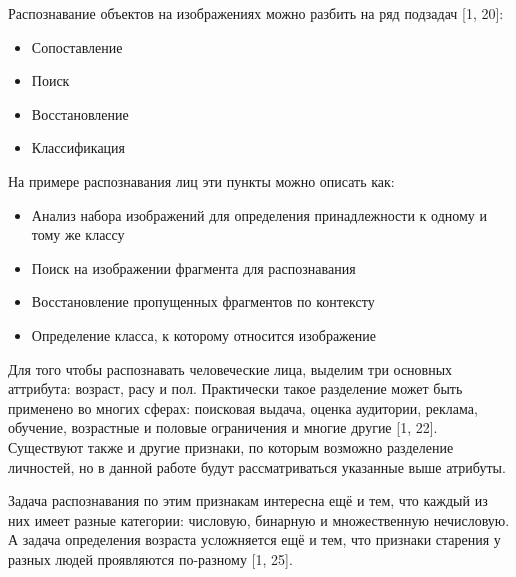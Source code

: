 \documentclass[main.tex]{subfiles}
\begin{document}
Распознавание объектов на изображениях можно разбить на ряд подзадач [1, 20]:
\begin{itemize}
    \item Сопоставление
    \item Поиск
    \item Восстановление
    \item Классификация
\end{itemize}

На примере распознавания лиц эти пункты можно описать как:
\begin{itemize}
    \item Анализ набора изображений для определения принадлежности к одному и тому же классу
    \item Поиск на изображении фрагмента для распознавания
    \item Восстановление пропущенных фрагментов по контексту
    \item Определение класса, к которому относится изображение
\end{itemize}

Для того чтобы распознавать человеческие лица, выделим три основных аттрибута: возраст, расу и пол. Практически такое разделение может быть применено во многих сферах: поисковая выдача, оценка аудитории, реклама, обучение, возрастные и половые ограничения и многие другие [1, 22]. Существуют также и другие признаки, по которым возможно разделение личностей, но в данной работе будут рассматриваться указанные выше атрибуты.

Задача распознавания по этим признакам интересна ещё и тем, что каждый из них имеет разные категории: числовую, бинарную и множественную нечисловую. А задача определения возраста усложняется ещё и тем, что признаки старения у разных людей проявляются по-разному [1, 25].
\end{document}
